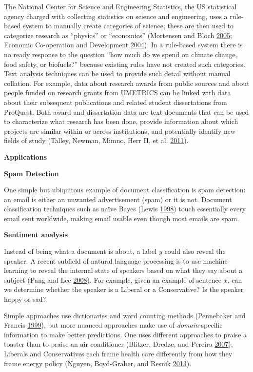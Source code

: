 \documentclass[]{krantz}
\begin{document}
The National Center for Science and Engineering Statistics, the US
statistical agency charged with collecting statistics on science and
engineering, uses a rule-based system to manually create categories of
science; these are then used to categorize research as ``physics'' or
``economics'' (Mortensen and Bloch
\protect\hyperlink{ref-oecd2005measurement}{2005}; Economic Co-operation
and Development \protect\hyperlink{ref-manual2004summary}{2004}). In a
rule-based system there is no ready response to the question ``how much
do we spend on climate change, food safety, or biofuels?'' because
existing rules have not created such categories. Text analysis
techniques can be used to provide such detail without manual collation.
For example, data about research awards from public sources and about
people funded on research grants from UMETRICS can be linked with data
about their subsequent publications and related student dissertations
from ProQuest. Both award and dissertation data are text documents that
can be used to characterize what research has been done, provide
information about which projects are similar within or across
institutions, and potentially identify new fields of study (Talley,
Newman, Mimno, Herr II, et al.
\protect\hyperlink{ref-talley2011database}{2011}).

\textbf{Applications}

\textbf{Spam Detection}

One simple but ubiquitous example of document classification is spam
detection: an email is either an unwanted advertisement (spam) or it is
not. Document classification techniques such as naïve Bayes (Lewis
\protect\hyperlink{ref-lewis-05}{1998}) touch essentially every email
sent worldwide, making email usable even though most emails are spam.

\textbf{Sentiment analysis}

Instead of being what a document is about, a label \(y\) could also
reveal the speaker. A recent subfield of natural language processing is
to use machine learning to reveal the internal state of speakers based
on what they say about a subject (Pang and Lee
\protect\hyperlink{ref-pang-08}{2008}). For example, given an example of
sentence \(x\), can we determine whether the speaker is a Liberal or a
Conservative? Is the speaker happy or sad?

Simple approaches use dictionaries and word counting methods (Pennebaker
and Francis \protect\hyperlink{ref-pennebaker-99}{1999}), but more
nuanced approaches make use of \emph{domain}-specific information to
make better predictions. One uses different approaches to praise a
toaster than to praise an air conditioner (Blitzer, Dredze, and Pereira
\protect\hyperlink{ref-blitzer-07}{2007}); Liberals and Conservatives
each frame health care differently from how they frame energy policy
(Nguyen, Boyd-Graber, and Resnik
\protect\hyperlink{ref-nguyen-13:shlda}{2013}).
\end{document}
